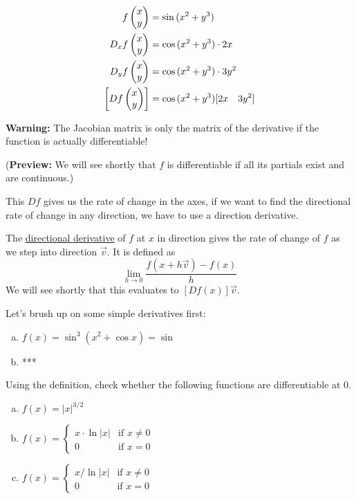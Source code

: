 \example
\begin{align*}
  f\begin{pmatrix} x \\ y \end{pmatrix} &= \sin{(x^2+y^3)} \\
  D_x f\begin{pmatrix} x \\ y \end{pmatrix} &= \cos{(x^2 + y^3)}\cdot 2x \\
  D_y f\begin{pmatrix} x \\ y \end{pmatrix} &= \cos{(x^2 + y^3)}\cdot 3y^2 \\
  \left[Df\begin{pmatrix} x \\ y \end{pmatrix}\right] &= \cos{(x^2 + y^3) [2x \quad 3y^2]}
\end{align*}

\textbf{Warning:} The Jacobian matrix is only the matrix of the derivative if the function is actually differentiable!

(\textbf{Preview:} We will see shortly that $f$ is differentiable if all its partials exist and are continuous.)

This $Df$ gives us the rate of change in the axes, if we want to find the directional rate of change in any direction, we have to use a direction derivative.

\begin{defn}
The \ul{directional derivative} of $f$ at $x$ in direction  gives the rate of change of $f$ as we step into direction $\vec{v}$. It is defined as
\[\lim_{h\to 0}\frac{f(x+h\vec{v})-f(x)}{h}\]
We will see shortly that this evaluates to $[Df(x)]\vec{v}$.
\end{defn}

Let's brush up on some simple derivatives first:
\begin{enumerate}[a.]
  \item $f(x) = \sin^3{(x^2 + \cos{x})} = \sin$
  \item ***
\end{enumerate}

 Using the definition, check whether the following functions are differentiable at 0.
\begin{enumerate}[a.]
  \item $f(x) = |x|^{3/2}$
  \item $\displaystyle f(x) = \begin{cases}x \cdot \ln{|x|} & \text{if } x \neq 0 \\ 0 & \text{if } x = 0 \end{cases}$ \\
  \item $\displaystyle f(x) = \begin{cases}x/ \ln{|x|} & \text{if } x \neq 0 \\ 0 & \text{if } x = 0\end{cases}$ \\
\end{enumerate}
